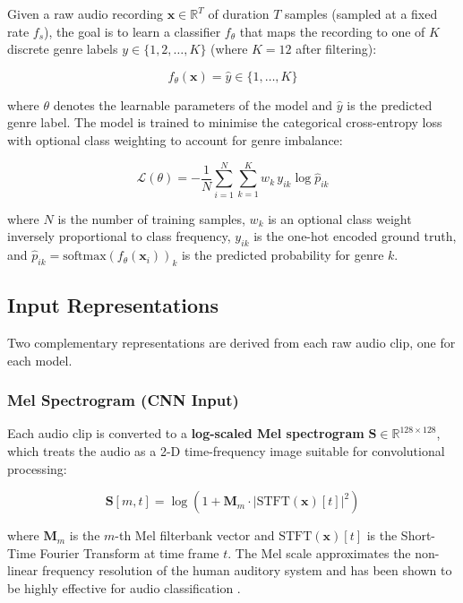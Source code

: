 \documentclass[12pt, a4paper]{article}
\begin{document}
Given a raw audio recording $\mathbf{x} \in \mathbb{R}^{T}$ of duration $T$ samples
(sampled at a fixed rate $f_s$), the goal is to learn a classifier $f_\theta$ that
maps the recording to one of $K$ discrete genre labels $y \in \{1, 2, \ldots, K\}$
(where $K = 12$ after filtering):

\begin{equation}
    f_\theta(\mathbf{x}) = \hat{y} \in \{1, \ldots, K\}
    \label{eq:classifier}
\end{equation}

where $\theta$ denotes the learnable parameters of the model and $\hat{y}$ is the
predicted genre label. The model is trained to minimise the categorical cross-entropy
loss with optional class weighting to account for genre imbalance:

\begin{equation}
    \mathcal{L}(\theta) = -\frac{1}{N} \sum_{i=1}^{N} \sum_{k=1}^{K}
    w_k \, y_{ik} \log \hat{p}_{ik}
    \label{eq:loss}
\end{equation}

where $N$ is the number of training samples, $w_k$ is an optional class weight
inversely proportional to class frequency, $y_{ik}$ is the one-hot encoded ground truth,
and $\hat{p}_{ik} = \text{softmax}(f_\theta(\mathbf{x}_i))_k$ is the predicted
probability for genre $k$.

\subsection{Input Representations}

Two complementary representations are derived from each raw audio clip, one for each
model.

\subsubsection{Mel Spectrogram (CNN Input)}

Each audio clip is converted to a \textbf{log-scaled Mel spectrogram} $\mathbf{S}
\in \mathbb{R}^{128 \times 128}$, which treats the audio as a 2-D time-frequency
image suitable for convolutional processing:

\begin{equation}
    \mathbf{S}[m, t] = \log\!\left(1 + \mathbf{M}_m \cdot |\text{STFT}(\mathbf{x})[t]|^2\right)
    \label{eq:melspec}
\end{equation}

where $\mathbf{M}_m$ is the $m$-th Mel filterbank vector and $\text{STFT}(\mathbf{x})[t]$
is the Short-Time Fourier Transform at time frame $t$. The Mel scale approximates
the non-linear frequency resolution of the human auditory system and has been shown to
be highly effective for audio classification \citep{hershey2017cnn}.
\end{document}
